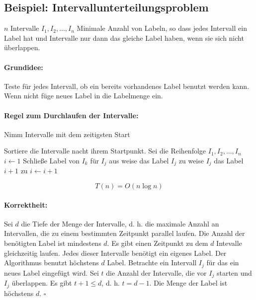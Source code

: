 \subsection{Beispiel: Intervallunterteilungsproblem}
\Geg $n$ Intervalle $I_1, I_2,...,I_n$
\Ges Minimale Anzahl von Labeln, so dass jedes Intervall ein Label hat und Intervalle nur dann das gleiche Label haben, wenn sie sich nicht überlappen.

\paragraph*{Grundidee:} Teste für jedes Intervall, ob ein bereits vorhandenes Label benutzt werden kann. Wenn nicht füge neues Label in die Labelmenge ein.

\paragraph*{Regel zum Durchlaufen der Intervalle:} Nimm Intervalle mit dem zeitigsten Start
\begin{algorithmic}
 \STATE Sortiere die Intervalle nacht ihrem Startpunkt. Sei die Reihenfolge $I_1, I_2, ..., I_n$
 \STATE $i \gets 1$
      \STATE Schließe Label von $I_k$ für $I_j$ aus
  \ENDFOR
      \STATE weise das Label $I_j$ zu
  \ELSE
      \STATE weise $I_j$ das Label $i+1$ zu
      \STATE $i \gets i + 1$
  \ENDIF 
 \ENDFOR
\end{algorithmic}
\[T(n) = O(n \log n)\]

\paragraph*{Korrektheit:} Sei $d$ die Tiefe der Menge der Intervalle, d. h. die maximale Anzahl an Intervallen, die zu einem bestimmten Zeitpunkt parallel laufen.
\Beh Die Anzahl der benötigten Label ist mindestens $d$.
\Bew Es gibt einen Zeitpunkt zu dem $d$ Intevalle gleichzeitig laufen. Jedes dieser Intervalle benötigt ein eigenes Label.
\Beh Der Algorithmus benutzt höchstens $d$ Label.
\Bew Betrachte ein Intervall $I_j$ für das ein neues Label eingefügt wird. Sei $t$ die Anzahl der Intervalle, die vor $I_j$ starten und $I_j$ überlappen. Es gibt $t + 1 \leq d$, d. h. $t = d - 1$. Die Menge der Label ist höchstens $d$. \hfill $ \square$ 